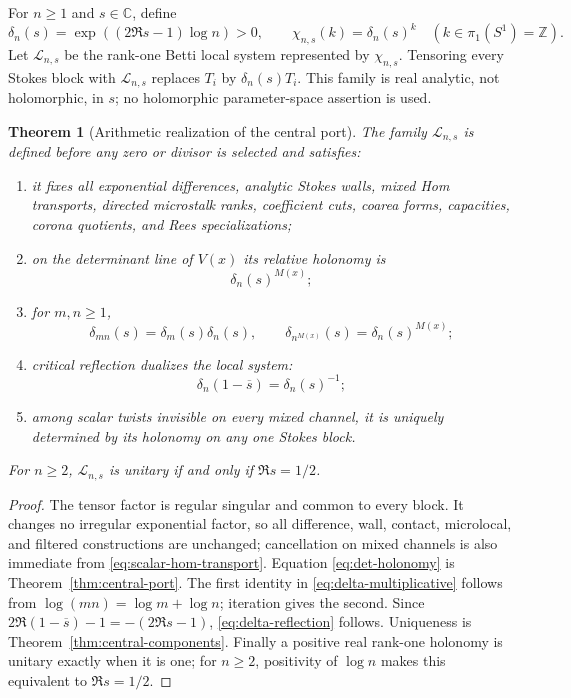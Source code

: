 \documentclass[11pt,a4paper]{amsart}
\theoremstyle{plain}
\newtheorem{theorem}{Theorem}[section]
\theoremstyle{definition}
\newcommand{\CC}{\mathbb C}
\begin{document}
For $n\geq1$ and $s\in\CC$, define
\begin{equation}\label{eq:delta-character}
 \delta_n(s)=\exp((2\Re s-1)\log n)>0,\qquad
 \chi_{n,s}(k)=\delta_n(s)^k\quad(k\in\pi_1(S^1)=\mathbb Z).
\end{equation}
Let $\mathcal L_{n,s}$ be the rank-one Betti local system represented by $\chi_{n,s}$.  Tensoring
every Stokes block with $\mathcal L_{n,s}$ replaces $T_i$ by $\delta_n(s)T_i$.  This family is
real analytic, not holomorphic, in $s$; no holomorphic parameter-space assertion is used.

\begin{theorem}[Arithmetic realization of the central port]\label{thm:arithmetic-center}
The family $\mathcal L_{n,s}$ is defined before any zero or divisor is selected and satisfies:
\begin{enumerate}[label=\textup{(\roman*)}]
\item it fixes all exponential differences, analytic Stokes walls, mixed Hom transports, directed
microstalk ranks, coefficient cuts, coarea forms, capacities, corona quotients, and Rees
specializations;
\item on the determinant line of $V(x)$ its relative holonomy is
\begin{equation}\label{eq:det-holonomy}
                       \delta_n(s)^{M(x)};
\end{equation}
\item for $m,n\geq1$,
\begin{equation}\label{eq:delta-multiplicative}
 \delta_{mn}(s)=\delta_m(s)\delta_n(s),\qquad
 \delta_{n^{M(x)}}(s)=\delta_n(s)^{M(x)};
\end{equation}
\item critical reflection dualizes the local system:
\begin{equation}\label{eq:delta-reflection}
                  \delta_n(1-\overline s)=\delta_n(s)^{-1};
\end{equation}
\item among scalar twists invisible on every mixed channel, it is uniquely determined by its
holonomy on any one Stokes block.
\end{enumerate}
For $n\geq2$, $\mathcal L_{n,s}$ is unitary if and only if $\Re s=1/2$.
\end{theorem}

\begin{proof}
The tensor factor is regular singular and common to every block.  It changes no irregular
exponential factor, so all difference, wall, contact, microlocal, and filtered constructions are
unchanged; cancellation on mixed channels is also immediate from
\eqref{eq:scalar-hom-transport}.  Equation \eqref{eq:det-holonomy} is
Theorem~\ref{thm:central-port}.  The first identity in \eqref{eq:delta-multiplicative} follows from
$\log(mn)=\log m+\log n$; iteration gives the second.  Since
$2\Re(1-\overline s)-1=-(2\Re s-1)$, \eqref{eq:delta-reflection} follows.  Uniqueness is
Theorem~\ref{thm:central-components}.  Finally a positive real rank-one holonomy is unitary exactly
when it is one; for $n\geq2$, positivity of $\log n$ makes this equivalent to
$\Re s=1/2$.
\end{proof}
\end{document}
